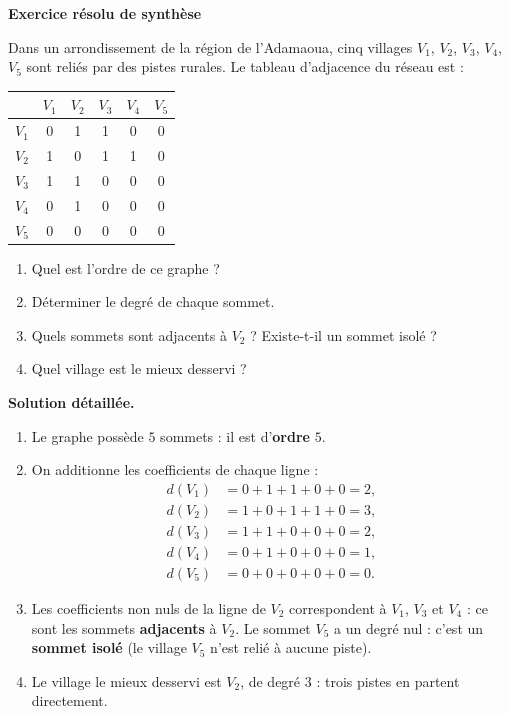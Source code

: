 \documentclass[11pt]{article}
\begin{document}
\textbf{Exercice résolu de synthèse}\par

\begin{exoresolu}
Dans un arrondissement de la région de l'Adamaoua, cinq villages $V_1$, $V_2$, $V_3$, $V_4$, $V_5$ sont reliés par des pistes rurales. Le tableau d'adjacence du réseau est :
\begin{center}
\begin{tabular}{|c|ccccc|}
\hline
\rowcolor{popgreenL} & $V_1$ & $V_2$ & $V_3$ & $V_4$ & $V_5$ \\
\hline
$V_1$ & 0 & 1 & 1 & 0 & 0 \\
\hline
$V_2$ & 1 & 0 & 1 & 1 & 0 \\
\hline
$V_3$ & 1 & 1 & 0 & 0 & 0 \\
\hline
$V_4$ & 0 & 1 & 0 & 0 & 0 \\
\hline
$V_5$ & 0 & 0 & 0 & 0 & 0 \\
\hline
\end{tabular}
\end{center}
\begin{enumerate}
\item Quel est l'ordre de ce graphe ?
\item Déterminer le degré de chaque sommet.
\item Quels sommets sont adjacents à $V_2$ ? Existe-t-il un sommet isolé ?
\item Quel village est le mieux desservi ?
\end{enumerate}
\tcblower
\textbf{Solution détaillée.}
\begin{enumerate}
\item Le graphe possède $5$ sommets : il est d'\textbf{ordre} $5$.
\item On additionne les coefficients de chaque ligne :
\begin{align*}
d(V_1) &= 0+1+1+0+0 = 2,\\
d(V_2) &= 1+0+1+1+0 = 3,\\
d(V_3) &= 1+1+0+0+0 = 2,\\
d(V_4) &= 0+1+0+0+0 = 1,\\
d(V_5) &= 0+0+0+0+0 = 0.
\end{align*}
\item Les coefficients non nuls de la ligne de $V_2$ correspondent à $V_1$, $V_3$ et $V_4$ : ce sont les sommets \textbf{adjacents} à $V_2$. Le sommet $V_5$ a un degré nul : c'est un \textbf{sommet isolé} (le village $V_5$ n'est relié à aucune piste).
\item Le village le mieux desservi est $V_2$, de degré $3$ : trois pistes en partent directement.
\end{enumerate}
\end{exoresolu}
\end{document}

